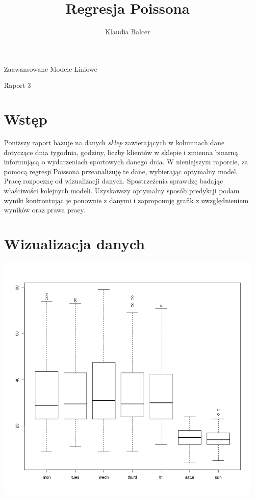 \documentclass[a4paper,11pt]{article}
\author{Klaudia Balcer}
\title{Regresja Poissona}
\begin{document}
\maketitle
\begin{center}
Zaawansowane Modele Liniowe

Raport 3 
\end{center}
\tableofcontents

\section*{Wstęp}

Poniższy raport bazuje na danych \textit{sklep} zawierających w kolumnach dane dotyczące dnia tygodnia, godziny, liczby klientów w sklepie i zmienna binarną informującą o wydarzeniach sportowych danego dnia. W nieniejszym raporcie, za pomocą regresji Poissona przeanalizuję te dane,  wybierając optymalny model. Pracę rozpocznę od wizualizacji danych. Spostrzeżenia sprawdzę badając właściwości kolejnych modeli. Uzyskawszy optymalny sposób predykcji podam wyniki konfrontując je  ponownie z danymi i zaproponuję grafik z uwzględnieniem wyników oraz prawa pracy. 



\pagebreak

\section{Wizualizacja danych}



\includegraphics[scale=.7]{boxplot1.png} 
\end{document}
